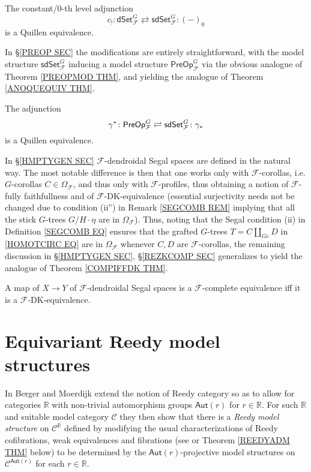 \documentclass[a4paper,10pt
,draft
]{article}%
\begin{document}
\begin{theorem}\label{FINC0AGJ THM}
	The constant/$0$-th level adjunction
	\[
	c_!\colon 
	\mathsf{dSet}^G_{\mathcal{F}} \rightleftarrows \mathsf{sdSet}^G_{\mathcal{F}}
	\colon (-)_0
	\]
	is a Quillen equivalence.
\end{theorem}
In \S \ref{PREOP SEC} the modifications are entirely straightforward, with the model structure 
$\mathsf{sdSet}^G_{\mathcal{F}}$
inducing a model structure
$\mathsf{PreOp}^G_{\mathcal{F}}$ via the obvious analogue of 
Theorem \ref{PREOPMOD THM}, and yielding the analogue of Theorem \ref{ANOQUEQUIV THM}.
\begin{theorem}\label{FANOQUEQUIV THM}
The adjunction
\[
	\gamma^{\**} \colon \mathsf{PreOp}^G_{\mathcal{F}}
\rightleftarrows
	\mathsf{sdSet}^G_{\mathcal{F}} \colon \gamma_{\**}
\]
is a Quillen equivalence.
\end{theorem}
In \S \ref{HMPTYGEN SEC} $\mathcal{F}$-dendroidal Segal spaces are defined in the natural way. The most notable difference is then that one works only with 
$\mathcal{F}$-corollas, i.e. $G$-corollas
$C \in \Omega_{\mathcal{F}}$,
and thus only with $\mathcal{F}$-profiles, thus obtaining a notion of $\mathcal{F}$-fully faithfullness and of $\mathcal{F}$-DK-equivalence 
(essential surjectivity needs not be changed due to condition (ii'') in Remark \ref{SEGCOMB REM} implying that all the stick $G$-trees $G/H \cdot \eta$ are in $\Omega_{\mathcal{F}}$).
Thus, noting that the Segal condition (ii) in Definition \eqref{SEGCOMB EQ} %
ensures that the grafted $G$-trees 
$T=C \amalg_{Ge} D$ in \eqref{HOMOTCIRC EQ}
are in $\Omega_{\mathcal{F}}$
whenever $C,D$ are $\mathcal{F}$-corollas,
the remaining discussion in 
\S \ref{HMPTYGEN SEC}, \S \ref{REZKCOMP SEC}
generalizes to yield the analogue of 
Theorem \ref{COMPIFFDK THM}.
\begin{theorem}\label{FCOMPIFFDK THM}
A map of $X \to Y$ of $\mathcal{F}$-dendroidal Segal spaces is a $\mathcal{F}$-complete equivalence iff it is a $\mathcal{F}$-DK-equivalence.
\end{theorem}



\appendix

\section{Equivariant Reedy model structures}\label{EQREED AP}


In \cite{BM11} Berger and Moerdijk extend the notion of Reedy category so as to allow for categories $\mathbb{R}$
 with non-trivial automorphism groups 
 $\mathsf{Aut}(r)$ for $r \in \mathbb{R}$.
For such $\mathbb{R}$ and suitable model category $\mathcal{C}$ they then show that there is a 
\textit{Reedy model structure}
on $\mathcal{C}^{\mathbb{R}}$
defined by modifying the usual characterizations of
Reedy cofibrations, weak equivalences and fibrations
(see \cite[Thm. 1.6]{BM11} or
Theorem \ref{REEDYADM THM} below)
 to be determined by the $\mathsf{Aut}(r)$-projective model structures
on $\mathcal{C}^{\mathsf{Aut}(r)}$
for each $r \in \mathbb{R}$. 
\end{document}

